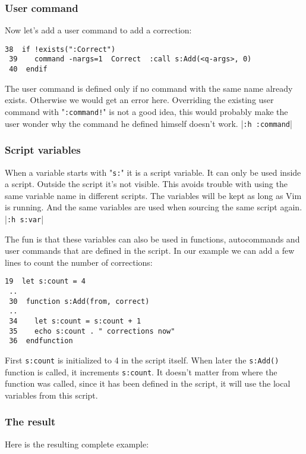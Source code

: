 \subsubsection{User command}
Now let's add a user command to add a correction:

\begin{Verbatim}[samepage=true]
 38  if !exists(":Correct")
 39    command -nargs=1  Correct  :call s:Add(<q-args>, 0)
 40  endif
\end{Verbatim}

The user command is defined only if no command with the same name already exists.
Otherwise we would get an error here.
Overriding the existing user command with "\texttt{:command!}" is not a good idea, this would probably make the user wonder why the command he defined himself doesn't work.
|\texttt{:h :command}|

\subsubsection{Script variables}
When a variable starts with "\texttt{s:}" it is a script variable.
It can only be used inside a script.
Outside the script it's not visible.
This avoids trouble with using the same variable name in different scripts.
The variables will be kept as long as Vim is running.
And the same variables are used when sourcing the same script again. |\texttt{:h s:var}|

The fun is that these variables can also be used in functions, autocommands and user commands that are defined in the script.
In our example we can add a few lines to count the number of corrections:

\begin{Verbatim}[samepage=true]
 19  let s:count = 4
 ..
 30  function s:Add(from, correct)
 ..
 34    let s:count = s:count + 1
 35    echo s:count . " corrections now"
 36  endfunction
\end{Verbatim}

First \texttt{s:count} is initialized to 4 in the script itself.
When later the \texttt{s:Add()} function is called, it increments \texttt{s:count}.
It doesn't matter from where the function was called, since it has been defined in the script, it will use the local variables from this script.

\subsubsection{The result}
Here is the resulting complete example:

